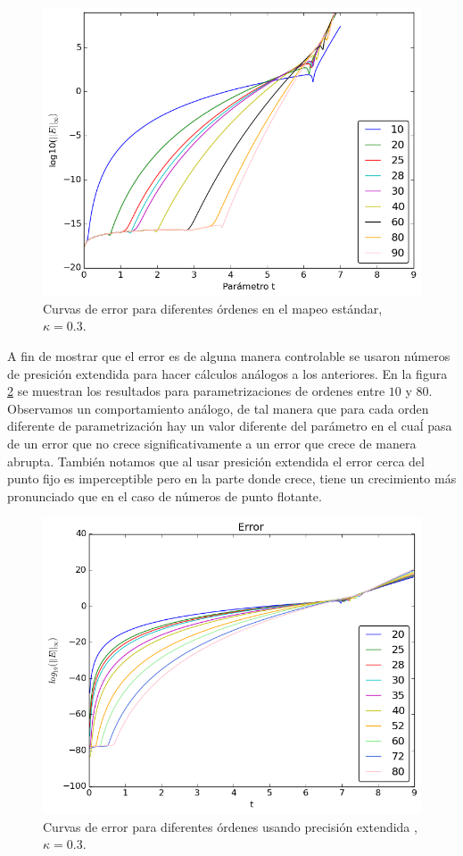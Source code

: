 \begin{figure}[H]
\centering
\includegraphics[scale=0.6]{error_estandar_orden}
\caption{Curvas de error para diferentes órdenes en el mapeo estándar,$\kappa=0.3$. }
\label{erroresf64}
\end{figure}
A fin de mostrar que el error es de alguna manera controlable se usaron números de presición extendida para hacer cálculos análogos a los anteriores. En la figura \ref{erroresBig} se muestran los resultados para parametrizaciones de ordenes entre $10$ y $80$. Observamos un comportamiento análogo, de tal manera que para cada orden diferente de parametrización hay un valor diferente del parámetro en el cuaĺ pasa de un error que no crece significativamente a un error que crece de manera abrupta. También notamos que al usar presición extendida el error cerca del punto fijo es imperceptible pero en la parte donde crece, tiene un crecimiento más pronunciado que en el caso de números de punto flotante. 

\begin{figure}[H]
\centering
\includegraphics[scale=0.6]{error_estandar_orden_big}
\caption{Curvas de error para diferentes órdenes usando precisión extendida ,$\kappa=0.3$. }
\label{erroresBig}
\end{figure}

